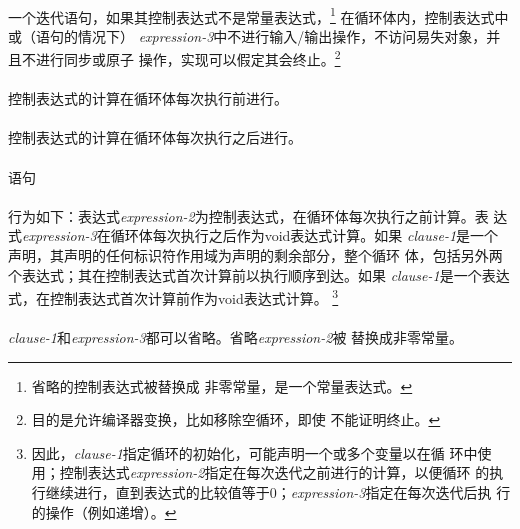 {\paragraph{}
一个迭代语句，如果其控制表达式不是常量表达式，\footnote{省略的控制表达式被替换成
非零常量，是一个常量表达式。} 在循环体内，控制表达式中或（语句的情况下）
\textit{expression-3}中不进行输入/输出操作，不访问易失对象，并且不进行同步或原子
操作，实现可以假定其会终止。\footnote{目的是允许编译器变换，比如移除空循环，即使
不能证明终止。}

\paragraph{}
控制表达式的计算在循环体每次执行前进行。

\paragraph{}
控制表达式的计算在循环体每次执行之后进行。

\paragraph{}
语句                                                                          \\
\mbox{\hspace{4em}  \tm{;}  \tm{;}
   \tm{)} }                                    \\
行为如下：表达式\textit{expression-2}为控制表达式，在循环体每次执行之前计算。表
达式\textit{expression-3}在循环体每次执行之后作为void表达式计算。如果
\textit{clause-1}是一个声明，其声明的任何标识符作用域为声明的剩余部分，整个循环
体，包括另外两个表达式；其在控制表达式首次计算前以执行顺序到达。如果
\textit{clause-1}是一个表达式，在控制表达式首次计算前作为void表达式计算。
\footnote{因此，\textit{clause-1}指定循环的初始化，可能声明一个或多个变量以在循
环中使用；控制表达式\textit{expression-2}指定在每次迭代之前进行的计算，以便循环
的执行继续进行，直到表达式的比较值等于0；\textit{expression-3}指定在每次迭代后执
行的操作（例如递增）。}

\paragraph{}
\textit{clause-1}和\textit{expression-3}都可以省略。省略\textit{expression-2}被
替换成非零常量。

}
